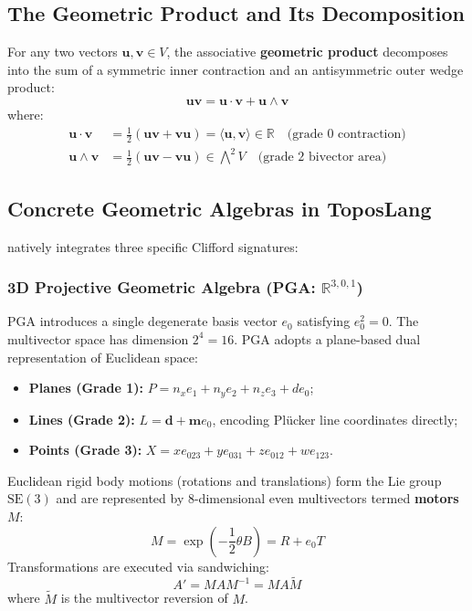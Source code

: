 \subsection{The Geometric Product and Its Decomposition}
For any two vectors $\mathbf{u}, \mathbf{v} \in V$, the associative \textbf{geometric product} decomposes into the sum of a symmetric inner contraction and an antisymmetric outer wedge product:
\begin{equation}
    \mathbf{u}\mathbf{v} = \mathbf{u} \cdot \mathbf{v} + \mathbf{u} \wedge \mathbf{v}
\end{equation}
where:
\begin{align}
    \mathbf{u} \cdot \mathbf{v} &= \frac{1}{2}(\mathbf{u}\mathbf{v} + \mathbf{v}\mathbf{u}) = \langle \mathbf{u}, \mathbf{v} \rangle \in \mathbb{R} \quad \text{(grade 0 contraction)} \\
    \mathbf{u} \wedge \mathbf{v} &= \frac{1}{2}(\mathbf{u}\mathbf{v} - \mathbf{v}\mathbf{u}) \in \bigwedge^2 V \quad \text{(grade 2 bivector area)}
\end{align}

\subsection{Concrete Geometric Algebras in ToposLang}
\ToposLang{} natively integrates three specific Clifford signatures:

\subsubsection{3D Projective Geometric Algebra (PGA: $\mathbb{R}^{3,0,1}$)}
PGA introduces a single degenerate basis vector $e_0$ satisfying $e_0^2 = 0$. The multivector space has dimension $2^4 = 16$. PGA adopts a plane-based dual representation of Euclidean space:
\begin{itemize}[leftmargin=1.5cm]
    \item \textbf{Planes (Grade 1):} $P = n_x e_1 + n_y e_2 + n_z e_3 + d e_0$;
    \item \textbf{Lines (Grade 2):} $L = \mathbf{d} + \mathbf{m} e_0$, encoding Plücker line coordinates directly;
    \item \textbf{Points (Grade 3):} $X = x e_{023} + y e_{031} + z e_{012} + w e_{123}$.
\end{itemize}
Euclidean rigid body motions (rotations and translations) form the Lie group $\mathrm{SE}(3)$ and are represented by 8-dimensional even multivectors termed \textbf{motors} $M$:
\begin{equation}
    M = \exp\left(-\frac{1}{2}\theta B\right) = R + e_0 T
\end{equation}
Transformations are executed via sandwiching:
\begin{equation}
    A' = M A M^{-1} = M A \widetilde{M}
\end{equation}
where $\widetilde{M}$ is the multivector reversion of $M$.

